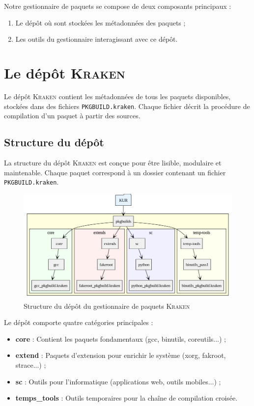 Notre gestionnaire de paquets se compose de deux composants principaux :
\begin{enumerate}
    \item Le dépôt où sont stockées les métadonnées des paquets ;
    \item Les outils du gestionnaire interagissant avec ce dépôt.
\end{enumerate}

\section{Le dépôt \textsc{Kraken}}
\label{subsec:depot-kraken}

Le dépôt \textsc{Kraken} contient les métadonnées de tous les paquets disponibles, stockées dans des fichiers \texttt{PKGBUILD.kraken}. Chaque fichier décrit la procédure de compilation d'un paquet à partir des sources.

\subsection{Structure du dépôt }
\label{subsubsec:structure-depot}

La structure du dépôt \textsc{Kraken} est conçue pour être lisible, modulaire et maintenable. Chaque paquet correspond à un dossier contenant un fichier \texttt{PKGBUILD.kraken}.\\



\begin{figure}[H]
  \centering
  \includegraphics[width=1\textwidth]{images_pfe/repodotoff.png}
  \caption{Structure du dépôt du gestionnaire de paquets \textsc{Kraken}}
  \label{fig:krakenrepo}
\end{figure}

Le dépôt comporte quatre catégories principales :
\begin{itemize}
    \item \textbf{core} : Contient les paquets fondamentaux (gcc, binutils, coreutils...) ;
    \item \textbf{extend} : Paquets d'extension pour enrichir le système (xorg, fakroot, strace...) ;
    \item \textbf{sc} : Outils pour l'informatique (applications web, outils mobiles...) ;
    \item \textbf{temps\_tools} : Outils temporaires pour la chaîne de compilation croisée.
\end{itemize}


